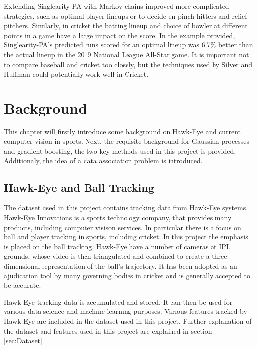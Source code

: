 \documentclass[12pt,a4paper]{report}
\theoremstyle{definition}
\begin{document}
Extending Singlearity-PA with Markov chains improved more complicated strategies, such as optimal player lineups or to decide on pinch hitters and relief pitchers. 
Similarly, in cricket the batting lineup and choice of bowler at different points in a game have a large impact on the score. 
In the example provided, Singlearity-PA's predicted runs scored for an optimal lineup was 6.7\% better than the actual lineup in the 2019 National League All-Star game. 
It is important not to compare baseball and cricket too closely, but the techniques used by Silver and Huffman could potentially work well in Cricket.

%

\chapter{Background}

This chapter will firstly introduce some background on Hawk-Eye and current computer vision in sports.
Next, the requisite background for Gaussian processes and gradient boosting, the two key methods used in this project is provided.
Additionaly, the idea of a data association problem is introduced. 

\section{Hawk-Eye and Ball Tracking}

The dataset used in this project contains tracking data from Hawk-Eye systems.
Hawk-Eye Innovations is a sports technology company, that provides many products, including computer visison services.
In particular there is a focus on ball and player tracking in sports, including cricket.
In this project the emphasis is placed on the ball tracking.
Hawk-Eye have a number of cameras at IPL grounds, whose video is then triangulated and combined to create a three-dimensional representation of the ball's trajectory.
It has been adopted as an ajudication tool by many governing bodies in cricket and is generally accepted to be accurate.

Hawk-Eye tracking data is accumulated and stored. 
It can then be used for various data science and machine learning purposes.
Various features tracked by Hawk-Eye are included in the dataset used in this project.
Further explanation of the dataset and features used in this project are explained in section \ref{sec:Dataset}.
\end{document}
